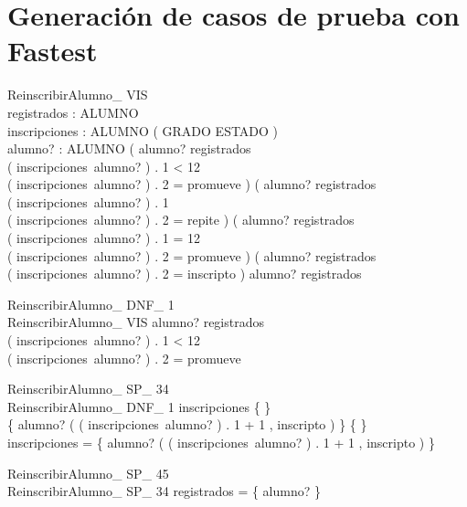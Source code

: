 \documentclass{article}
\begin{document}
\section*{Generación de casos de prueba con Fastest}

\begin{schema}{ReinscribirAlumno\_ VIS}\\
 registrados : \power ALUMNO \\
 inscripciones : ALUMNO \pfun ( GRADO \cross ESTADO ) \\
 alumno? : ALUMNO 
\where
 ( alumno? \in registrados \\
 ( inscripciones~alumno? ) . 1 < 12 \\
 ( inscripciones~alumno? ) . 2 = promueve ) \lor ( alumno? \in registrados \\
 ( inscripciones~alumno? ) . 1  \\
 ( inscripciones~alumno? ) . 2 = repite ) \lor ( alumno? \in registrados \\
 ( inscripciones~alumno? ) . 1 = 12 \\
 ( inscripciones~alumno? ) . 2 = promueve ) \lor ( alumno? \in registrados \\
 ( inscripciones~alumno? ) . 2 = inscripto ) \lor alumno? \notin registrados
\end{schema}


\begin{schema}{ReinscribirAlumno\_ DNF\_ 1}\\
 ReinscribirAlumno\_ VIS 
\where
 alumno? \in registrados \\
 ( inscripciones~alumno? ) . 1 < 12 \\
 ( inscripciones~alumno? ) . 2 = promueve
\end{schema}


\begin{schema}{ReinscribirAlumno\_ SP\_ 34}\\
 ReinscribirAlumno\_ DNF\_ 1 
\where
 inscripciones \neq \{ \} \\
 \{ alumno? \mapsto ( ( inscripciones~alumno? ) . 1 + 1 , inscripto ) \} \neq \{ \} \\
 \dom inscripciones = \dom \{ alumno? \mapsto ( ( inscripciones~alumno? ) . 1 + 1 , inscripto ) \}
\end{schema}


\begin{schema}{ReinscribirAlumno\_ SP\_ 45}\\
 ReinscribirAlumno\_ SP\_ 34 
\where
 registrados = \{ alumno? \}
\end{schema}
\end{document}
